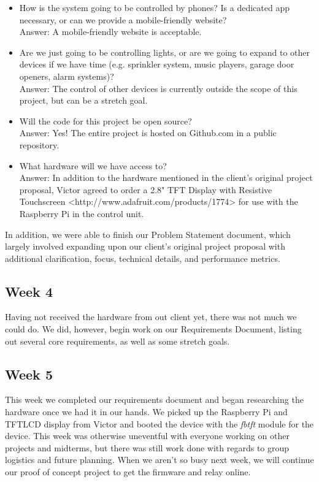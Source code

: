 \documentclass[letterpaper,10pt]{article}
\begin{document}
\begin{itemize}
    \item How is the system going to be controlled by phones?  Is a dedicated
        app necessary, or can we provide a mobile-friendly website?\\ Answer: A
        mobile-friendly website is acceptable.
    \item Are we just going to be controlling lights, or are we going to expand
        to other devices if we have time (e.g. sprinkler system, music players,
        garage door openers, alarm systems)?\\
        Answer: The control of other devices is currently outside the scope of
        this project, but can be a stretch goal.
    \item Will the code for this project be open source?\\
        Answer: Yes!  The entire project is hosted on Github.com in a public
        repository.
    \item What hardware will we have access to?\\
        Answer: In addition to the hardware mentioned in the client's original
        project proposal, Victor agreed to order a 2.8" TFT Display with
        Resistive Touchscreen <http://www.adafruit.com/products/1774> for use
        with the Raspberry Pi in the control unit.
\end{itemize}

In addition, we were able to finish our Problem Statement document, which
largely involved expanding upon our client's original project proposal with
additional clarification, focus, technical details, and performance metrics.

\subsection{Week 4}
 
Having not received the hardware from out client yet, there was not much we could do.  We did, however, begin work on our Requirements Document, listing out several core requirements, as well as some stretch goals.

\subsection{Week 5}

This week we completed our requirements document and began researching
the hardware once we had it in our hands. We picked up the Raspberry Pi
and TFTLCD display from Victor and booted the device with the \textit{fbtft} 
module for the device. This week was otherwise uneventful with everyone working
on other projects and midterms, but there was still work done with regards to 
group logistics and future planning. When we aren't so busy next week, we will
continue our proof of concept project to get the firmware and relay online.
\end{document}
